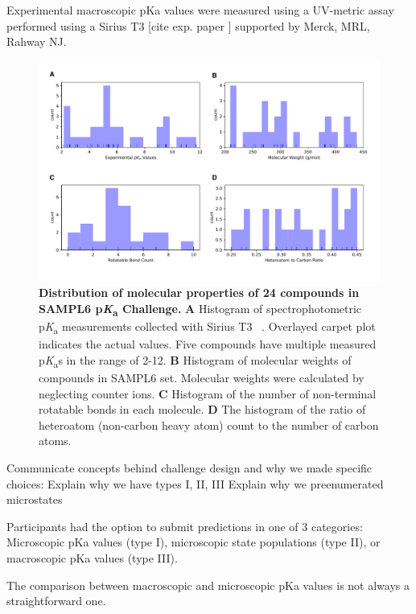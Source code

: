 \documentclass[9pt,lineno,final]{elife}
\newcommand{\pKa}{p\textit{K}\textsubscript{a}}
\begin{document}

Experimental macroscopic pKa values were measured using a UV-metric assay performed using a Sirius T3 [cite exp. paper ]  supported by Merck, MRL,  Rahway NJ.  

\begin{figure}
\begin{center}
\includegraphics[width=1.0\linewidth]{figures/distribution_of_molecular_properties.pdf}
\caption{{\bf Distribution of molecular properties of 24 compounds in SAMPL6 \pKa{} Challenge.} {\bf A} Histogram of spectrophotometric \pKa{} measurements collected with Sirius T3 ~\cite{Isik:2018:J.Comput.AidedMol.Des.}. Overlayed carpet plot indicates the actual values. Five compounds have multiple measured \pKa{}s in the range of 2-12. {\bf B} Histogram of molecular weights of compounds in SAMPL6 set. Molecular weights were calculated by neglecting counter ions. {\bf C} Histogram of the number of non-terminal rotatable bonds in each molecule. {\bf D} The histogram of the ratio of heteroatom (non-carbon heavy atom) count to the number of carbon atoms.
}
\label{fig:dist_mol_prop}
\end{center}
\end{figure}

Communicate concepts behind challenge design and why we made specific choices:
Explain why we have types I, II, III
Explain why we preenumerated microstates

Participants had the option to submit predictions in one of 3 categories: Microscopic pKa values (type I), microscopic state populations (type II), or macroscopic pKa values (type III).

The comparison between macroscopic and microscopic pKa values is not always a straightforward one. 
\end{document}
